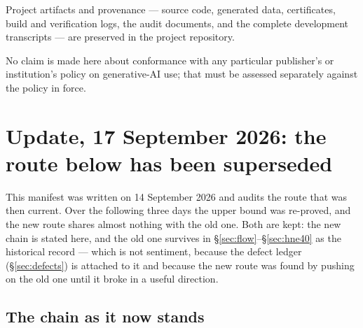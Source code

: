 \documentclass[11pt,a4paper]{article}
\theoremstyle{plain}
\theoremstyle{definition}
\theoremstyle{remark}
\begin{document}
Project artifacts and provenance --- source code, generated data, certificates,
build and verification logs, the audit documents, and the complete development
transcripts --- are preserved in the project repository.

No claim is made here about conformance with any particular publisher's or
institution's policy on generative-AI use; that must be assessed separately
against the policy in force.

\section{Update, 17 September 2026: the route below has been superseded}\label{sec:update}

This manifest was written on 14 September 2026 and audits the route that was
then current. Over the following three days the upper bound was re-proved, and
the new route shares almost nothing with the old one. Both are kept: the new
chain is stated here, and the old one survives in
\S\ref{sec:flow}--\S\ref{sec:hne40} as the historical record --- which is not
sentiment, because the defect ledger (\S\ref{sec:defects}) is attached to it and
because the new route was found by pushing on the old one until it broke in a
useful direction.

\subsection*{The chain as it now stands}
\end{document}
